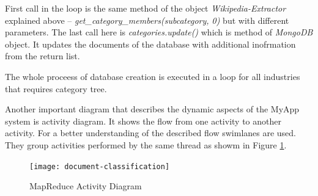 First call in the loop is the same method of the object \textit{Wikipedia-Extractor} explained above -- \textit{get\_category\_members(subcategory, 0)} but with different parameters. The last call here is \textit{categories.update()} which is method of \textit{MongoDB} object. It updates the documents of the database with additional inofrmation from the return list. 

The whole proceess of database creation is executed in a loop for all industries that requires category tree. 

Another important diagram that describes the dynamic aspects of the MyApp system is activity diagram. It shows the flow from one activity to another activity. For a better understanding of the described flow swimlanes are used. They group activities performed by the same thread as showm in Figure \ref{doc_uml}. 

\begin{figure}[!ht]
\centering
\texttt{[image: document-classification]}
\caption{MapReduce Activity Diagram}\label{doc_uml}
\end{figure}
















 






